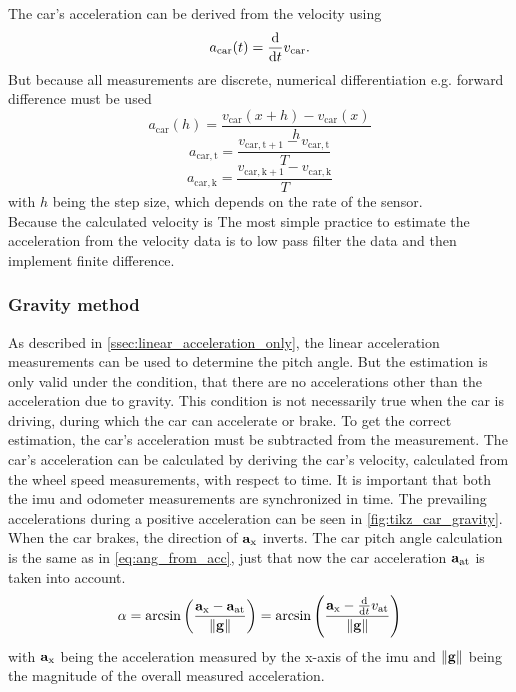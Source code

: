 The car's acceleration can be derived from the velocity using
\begin{equation}
	a_\mathrm{car}(t) = \dv{t}v_\mathrm{car}.
\end{equation}
But because all measurements are discrete, numerical differentiation e.g. forward difference must be used
\begin{equation}
	a_\mathrm{car}(h) = \frac{v_\mathrm{car}(x + h) - v_\mathrm{car}(x)}{h}
\end{equation}
\begin{equation}
	a_\mathrm{car, t} = \frac{v_\mathrm{car, t + 1} - v_\mathrm{car, t}}{T}
\end{equation}
\begin{equation}
	a_\mathrm{car, k} = \frac{v_\mathrm{car, k + 1} - v_\mathrm{car, k}}{T}
\end{equation}
with $h$ being the step size, which depends on the rate of the sensor.\\
Because the calculated velocity is
The most simple practice to estimate the acceleration from the velocity data is to low pass filter the data and then implement finite difference.

\subsubsection{Gravity method}
\label{subsubsec:gravity_method}
As described in \cref{ssec:linear_acceleration_only}, the linear acceleration measurements can be used to determine the pitch angle.
But the estimation is only valid under the condition, that there are no accelerations other than the acceleration due to gravity.
This condition is not necessarily true when the car is driving, during which the car can accelerate or brake.
To get the correct estimation, the car's acceleration must be subtracted from the measurement.
The car's acceleration can be calculated by deriving the car's velocity, calculated from the wheel speed measurements, with respect to time.
It is important that both the \gls{imu} and odometer measurements are synchronized in time.
The prevailing accelerations during a positive acceleration can be seen in \cref{fig:tikz_car_gravity}.
When the car brakes, the direction of $\vb{a}_\mathrm{x}$ inverts.
The car pitch angle calculation is the same as in \cref{eq:ang_from_acc}, just that now the car acceleration $\vb{a}_\mathrm{at}$ is taken into account.
\begin{equation}
	\label{eq:ang_from_acc_gravity}
	\alpha = \arcsin\left(\frac{\vb{a}_\mathrm{x} - \vb{a}_\mathrm{at}}{\norm{\vb{g}}}\right)
	= \arcsin\left(\frac{\vb{a}_\mathrm{x} - \dv{t}v_\mathrm{at} }{\norm{\vb{g}}}\right)
\end{equation}
with $\vb{a}_\mathrm{x}$ being the acceleration measured by the x-axis of the \gls{imu} and $\norm{\vb{g}}$ being the magnitude of the overall measured acceleration.